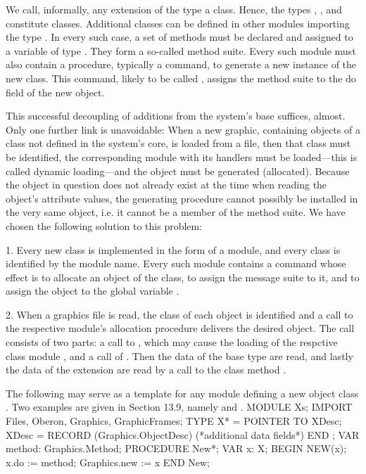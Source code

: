 We call, informally, any extension of the type  a class. Hence, the types , , and  constitute classes. Additional classes can be defined in other modules importing the type . In every such case, a set of methods must be declared and assigned to a variable of type . They form a so-called method suite. Every such module must also contain a procedure, typically a command, to generate a new instance of the new class. This command, likely to be called , assigns the method suite to the do field of the new object.

This successful decoupling of additions from the system's base suffices, almost. Only one further link is unavoidable: When a new graphic, containing objects of a class not defined in the system's core, is loaded from a file, then that class must be identified, the corresponding module with its handlers must be loaded---this is called dynamic loading---and the object must be generated (allocated). Because the object in question does not already exist at the time when reading the object's attribute values, the generating procedure cannot possibly be installed in the very same object, i.e. it cannot be a member of the method suite. We have chosen the following solution to this problem:

\item{1.} Every new class is implemented in the form of a module, and every class is identified by the module name. Every such module contains a command whose effect is to allocate an object of the class, to assign the message suite to it, and to assign the object to the global variable .
\item{2.} When a graphics file is read, the class of each object is identified and a call to the respective module's allocation procedure delivers the desired object. The call consists of two parts: a call to , which may cause the loading of the respctive class module , and a call of . Then the data of the base type  are read, and lastly the data of the extension are read by a call to the class method .

The following may serve as a template for any module defining a new object class . Two examples are given in Section 13.9, namely  and .
\begintt
MODULE Xs;
  IMPORT Files, Oberon, Graphics, GraphicFrames;
  TYPE X* = POINTER TO XDesc;
    XDesc = RECORD (Graphics.ObjectDesc)
              (*additional data fields*) END ;
  VAR method: Graphics.Method;
  PROCEDURE New*; VAR x: X;
  BEGIN NEW(x); x.do := method; Graphics.new := x
  END New;
  
